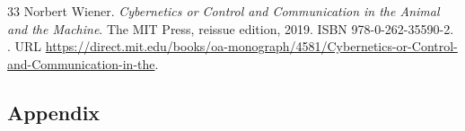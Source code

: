 \documentclass[12pt,fleqn]{article}
\begin{document}
\begin{thebibliography}{33}
  Norbert Wiener.
  \newblock \emph{Cybernetics or Control and Communication in the Animal and the
    Machine}.
  \newblock The {MIT} Press, reissue edition, 2019.
  \newblock ISBN 978-0-262-35590-2.
  \newblock {}.
  \newblock URL
  \url{https://direct.mit.edu/books/oa-monograph/4581/Cybernetics-or-Control-and-Communication-in-the}.

\end{thebibliography}


\clearpage
\begin{appendices}

  \section{Appendix}\label{appendix}

  





\end{appendices}
\end{document}
